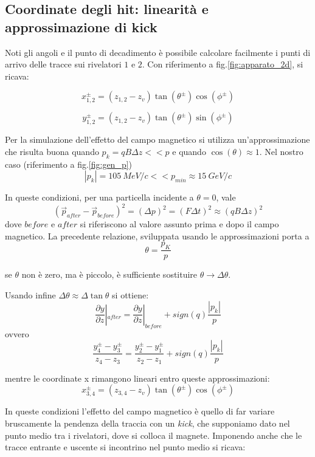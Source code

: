 \documentclass[8pt]{extarticle}
\begin{document}
\subsection{Coordinate degli hit: linearità e approssimazione di kick}
Noti gli angoli e il punto di decadimento è possibile calcolare facilmente i punti di arrivo delle tracce sui rivelatori $1$ e $2$. Con riferimento a fig.\ref{fig:apparato_2d}, si ricava:

\begin{equation}
x_{1,2}^{\pm} = (z_{1,2} - z_v) \tan(\theta^{\pm})\cos(\phi^{\pm})
\end{equation}

\begin{equation}
y_{1,2}^{\pm} = (z_{1,2} - z_v) \tan(\theta^{\pm})\sin(\phi^{\pm})
\end{equation}


Per la simulazione dell'effetto del campo magnetico si utilizza un'approssimazione che risulta buona quando $p_k = qB\Delta z << p$ e quando $\cos(\theta) \approx 1$. Nel nostro caso (riferimento a fig.\ref{fig:gen_p})
$$
|p_k| = 105\ MeV/c << p_{min} \approx 15\ GeV/c
$$

In queste condizioni, per una particella incidente a $\theta = 0$, vale
$$
(\vec{p}_{after}-\vec{p}_{before})^2 = (\Delta p)^2 = (F \Delta t)^2 \approx (qB\Delta z)^2
$$
dove $before$ e $after$ si riferiscono al valore assunto prima e dopo il campo magnetico. La precedente relazione, sviluppata usando le approssimazioni porta a
$$
\theta = \frac{p_K}{p}
$$

se $\theta$ non è zero, ma è piccolo, è sufficiente sostituire $\theta \rightarrow \Delta \theta$. 

Usando infine $\Delta \theta \approx \Delta \tan{\theta}$ si ottiene:
$$
\frac{\partial y}{\partial z}|_{after} = \frac{\partial y}{\partial z}|_{before} + sign(q)\frac{|p_k|}{p}
$$
ovvero
\begin{equation}
\frac{y_4^{\pm}-y_3^{\pm}}{z_4-z_3} = \frac{y_2^{\pm}-y_1^{\pm}}{z_2-z_1} + sign(q)\frac{|p_k|}{p}
\label{eq:curvatura}
\end{equation}


mentre le coordinate x rimangono lineari entro queste approssimazioni: 
\begin{equation}
x_{3,4}^{\pm} = (z_{3,4} - z_v) \tan(\theta^{\pm})\cos(\phi^{\pm})
\end{equation}

In queste condizioni l'effetto del campo magnetico è quello di far variare bruscamente la pendenza della traccia con un \textit{kick}, che supponiamo dato nel punto medio tra i rivelatori, dove si colloca il magnete. Imponendo anche che le tracce entrante e uscente si incontrino nel punto medio si ricava:
\end{document}
